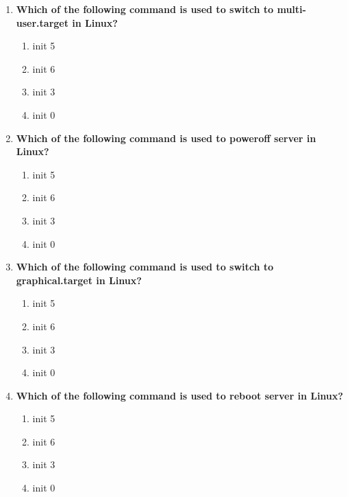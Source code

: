 \begin{flushleft}
\begin{enumerate}
		\item \textbf{Which of the following command is used to switch to multi-user.target in Linux?}
		\begin{enumerate}[label=(\alph*)]
			\item init 5 
			\item init 6 
			\item init 3  %
			\item init 0 
		\end{enumerate}
		\bigskip
		\bigskip

		\item \textbf{Which of the following command is used to poweroff server in Linux?}
		\begin{enumerate}[label=(\alph*)]
			\item init 5 
			\item init 6 
			\item init 3 
			\item init 0  %
		\end{enumerate}
		\bigskip
		\bigskip

		\item \textbf{Which of the following command is used to switch to graphical.target in Linux?}
		\begin{enumerate}[label=(\alph*)]
			\item init 5   %
			\item init 6 
			\item init 3 
			\item init 0   
		\end{enumerate}
		\bigskip
		\bigskip

		\item \textbf{Which of the following command is used to reboot server in Linux?}
		\begin{enumerate}[label=(\alph*)]
			\item init 5  
			\item init 6   %
			\item init 3 
			\item init 0   
		\end{enumerate}
		\bigskip
		\bigskip


\end{enumerate}
\end{flushleft}
